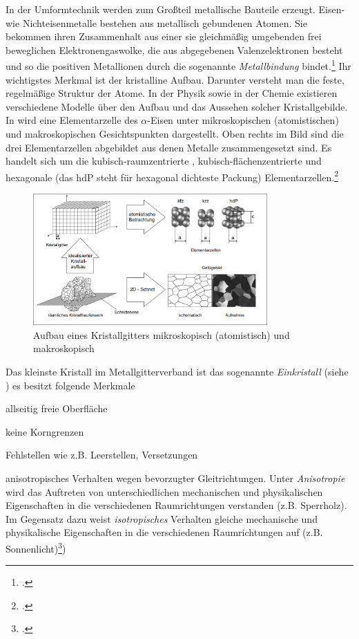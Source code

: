 \documentclass[12pt,a4paper,parskip]{scrartcl}
\begin{document}
{In der Umformtechnik werden zum Großteil metallische Bauteile erzeugt. Eisen- wie Nichteisenmetalle bestehen aus metallisch gebundenen Atomen. Sie bekommen ihren Zusammenhalt aus einer sie gleichmäßig umgebenden frei beweglichen Elektronengaswolke, die aus abgegebenen Valenzelektronen besteht und so die positiven Metallionen  durch die sogenannte \emph{Metallbindung} bindet.\footcite[Vgl.][12]{wki} Ihr wichtigstes Merkmal ist der kristalline Aufbau. Darunter versteht man die feste, regelmäßige Struktur der Atome. In der Physik sowie in der Chemie existieren verschiedene Modelle über den Aufbau und das Aussehen solcher Kristallgebilde. In  wird eine Elementarzelle des $\alpha $-Eisen unter mikroskopischen (atomistischen) und makroskopischen Gesichtspunkten dargestellt. Oben rechts im Bild sind die drei Elementarzellen abgebildet aus denen Metalle zusammengesetzt sind. Es handelt sich um die  kubisch-raumzentrierte , kubisch-flächenzentrierte und hexagonale (das hdP steht für hexagonal dichteste Packung) Elementarzellen.\footcite[Vgl.][3-5]{fu}
\begin{figure}
\centering
\includegraphics[width=0.8\textwidth]{makromikro}
\caption[Aufbau Kristallgitter]{Aufbau eines Kristallgitters mikroskopisch (atomistisch) und makroskopisch\protect\footnotemark}
\label{fig:makromikro}
\end{figure}


Das kleinste Kristall im Metallgitterverband ist das sogenannte \emph{Einkristall} (siehe ) es besitzt folgende Merkmale




\begin{itemize*}
\item allseitig freie Oberfläche
\item keine Korngrenzen
\item Fehlstellen wie z.B. Leerstellen, Versetzungen
\item anisotropisches Verhalten wegen bevorzugter Gleitrichtungen. Unter \emph{Anisotropie} wird das Auftreten von unterschiedlichen mechanischen und physikalischen Eigenschaften in die verschiedenen Raumrichtungen verstanden (z.B. Sperrholz). Im Gegensatz dazu weist \emph{isotropisches} Verhalten gleiche mechanische und physikalische Eigenschaften in die verschiedenen Raumrichtungen auf (z.B. Sonnenlicht)\footcite[Vgl.][37]{hu})



\end{itemize*}}
\end{document}

